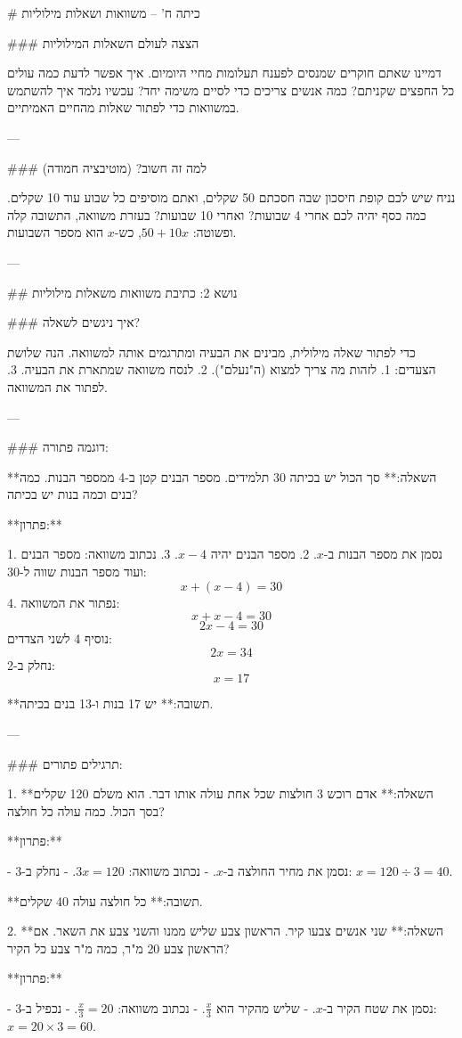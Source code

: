 # כיתה ח' – משוואות ושאלות מילוליות

### הצצה לעולם השאלות המילוליות

דמיינו שאתם חוקרים שמנסים לפענח תעלומות מחיי היומיום. איך אפשר לדעת כמה עולים כל החפצים שקניתם? כמה אנשים צריכים כדי לסיים משימה יחד? עכשיו נלמד איך להשתמש במשוואות כדי לפתור שאלות מהחיים האמיתיים.

---

### למה זה חשוב? (מוטיבציה חמודה)

נניח שיש לכם קופת חיסכון שבה חסכתם 50 שקלים, ואתם מוסיפים כל שבוע עוד 10 שקלים. כמה כסף יהיה לכם אחרי 4 שבועות? ואחרי 10 שבועות? בעזרת משוואה, התשובה קלה ופשוטה: $50 + 10x$, כש-$x$ הוא מספר השבועות.

---

## נושא 2: כתיבת משוואות משאלות מילוליות

### איך ניגשים לשאלה?

כדי לפתור שאלה מילולית, מבינים את הבעיה ומתרגמים אותה למשוואה. הנה שלושת הצעדים:
1. לזהות מה צריך למצוא (ה"נעלם").
2. לנסח משוואה שמתארת את הבעיה.
3. לפתור את המשוואה.

---

### דוגמה פתורה:

**השאלה:**
סך הכול יש בכיתה 30 תלמידים. מספר הבנים קטן ב-4 ממספר הבנות. כמה בנים וכמה בנות יש בכיתה?

**פתרון:**

1. נסמן את מספר הבנות ב-$x$.
2. מספר הבנים יהיה $x - 4$.
3. נכתוב משוואה: מספר הבנים ועוד מספר הבנות שווה ל-30:
   $$
x + (x - 4) = 30
$$
4. נפתור את המשוואה:
   $$
x + x - 4 = 30
$$
   $$
2x - 4 = 30
$$
   נוסיף 4 לשני הצדדים:
   $$
2x = 34
$$
   נחלק ב-2:
   $$
x = 17
$$

**תשובה:** יש 17 בנות ו-13 בנים בכיתה.

---

### תרגילים פתורים:

1. **השאלה:**
אדם רוכש 3 חולצות שכל אחת עולה אותו דבר. הוא משלם 120 שקלים בסך הכול. כמה עולה כל חולצה?

**פתרון:**

- נסמן את מחיר החולצה ב-$x$.
- נכתוב משוואה: $3x = 120$.
- נחלק ב-3: $x = 120 \div 3 = 40$.

**תשובה:** כל חולצה עולה 40 שקלים.

2. **השאלה:**
שני אנשים צבעו קיר. הראשון צבע שליש ממנו והשני צבע את השאר. אם הראשון צבע 20 מ"ר, כמה מ"ר צבע כל הקיר?

**פתרון:**

- נסמן את שטח הקיר ב-$x$.
- שליש מהקיר הוא $\frac{x}{3}$.
- נכתוב משוואה: $\frac{x}{3} = 20$.
- נכפיל ב-3: $x = 20 \times 3 = 60$.


